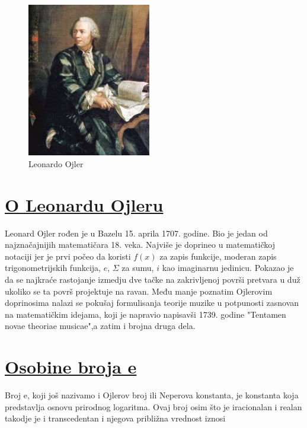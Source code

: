 \documentclass{article}
\begin{document}
\begin{figure}
  \begin{center}
    \includegraphics[width=0.48\textwidth]{lojlermodified.jpg}
  \end{center}
  \caption{Leonardo Ojler}
\end{figure}

\section*{\uline{O Leonardu Ojleru}}

Leonard Ojler rođen je u Bazelu 15. aprila 1707. godine.
Bio je jedan od najznačajnijih matematičara 18. veka.
Najviše je doprineo u matematičkoj notaciji jer je prvi počeo
da koristi $f(x)$ za zapis funkcije, moderan zapis trigonometrijskih funkcija, $e$, $\Sigma$
za sumu, $i$ kao imaginarnu jedinicu.
Pokazao je da se najkraće rastojanje izmedju dve tačke na zakrivljenoj površi pretvara u duž ukoliko se ta površ projektuje na ravan.
Među manje poznatim Ojlerovim doprinosima nalazi se pokušaj formulisanja teorije muzike u potpunosti zasnovan na matematičkim idejama, koji je napravio napisavši 1739. godine "Tentamen novae theoriae musicae",a zatim i brojna druga dela.
\newpage{}
	
	
	\section*{\underline{Osobine broja e}}
	
	
	Broj e, koji još nazivamo i Ojlerov broj ili Neperova konstanta, je konstanta koja predstavlja osnovu prirodnog logaritma. Ovaj broj osim što je iracionalan i realan takodje je i transcedentan i njegova približna vrednost iznosi
	
\end{document}
